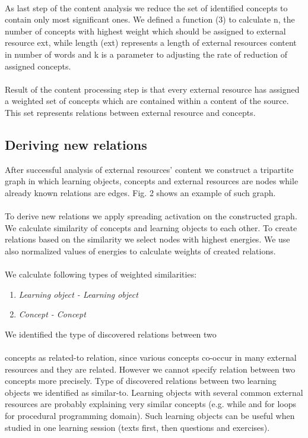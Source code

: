 \documentclass{llncs}
\begin{document}
\\
As last step of the content analysis we reduce the set of identified concepts to contain only most significant ones. We defined a function (3) to calculate n, the number of concepts with highest weight which should be assigned to external resource ext, while length (ext) represents a length of external resources content in number of words and k is a parameter to adjusting the rate of reduction of assigned concepts.\\
\\
Result of the content processing step is that every external resource has assigned a weighted set of concepts which are contained within a content of the source. This set represents relations between external resource and concepts. 
\subsection{Deriving new relations}
% 
After successful analysis of external resources’ content we construct a tripartite graph in which learning objects, concepts and external resources are nodes while already known relations are edges. Fig. 2 shows an example of such graph.\\
\\
To derive new relations we apply spreading activation on the constructed graph. We calculate similarity of concepts and learning objects to each other. To create relations based on the similarity we select nodes with highest energies. We use also normalized values of energies to calculate weights of created relations.\\
\\
We calculate following types of weighted similarities:
\begin{enumerate}
\item \textit{Learning object - Learning object} 
\item \textit{Concept - Concept} 
\end{enumerate}
We identified the type of discovered relations between two\\
\\
concepts as related-to relation, since various concepts co-occur in many external resources and they are related. However we cannot specify relation between two concepts more precisely. Type of discovered relations between two learning objects we identified as similar-to. Learning objects with several common external resources are probably explaining very similar concepts (e.g. while and for loops for procedural programming domain). Such learning objects can be useful when studied in one learning session (texts first, then questions and exercises). 
\end{document}
